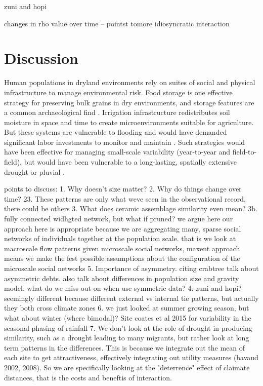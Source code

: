 \documentclass[fleqn,10pt]{wlscirep}
\begin{document}
zuni and hopi

changes in rho value over time -- pointst tomore idiosyncratic interaction


\section*{Discussion}
Human populations in dryland environments rely on suites of social and physical infrastructure to manage environmental risk. Food storage is one effective strategy for preserving bulk grains in dry environments, and storage features are a common archaeological find \cite{Spielmann2011SustainableEnvironments}. Irrigation infrastructure redistributes soil moisture in space and time to create microenvironments suitable for agriculture. But these systems are vulnerable to flooding and would have demanded significant labor investments to monitor and maintain \cite{Dominguez2005}. Such strategies would have been effective for managing small-scale variability (year-to-year and field-to-field), but would have been vulnerable to a long-lasting, spatially extensive drought or pluvial \cite{Halstead1989}.

points to discuss:
1. Why doesn't size matter?
2. Why do things change over time?
23. These patterns are only what weve seen in the observational record, there could be others
3. What does ceramic assemblage similarity even mean?
3b. fully connected widhgted network, but what if pruned?
  we argue here our approach here is appropriate because we are aggregating many, sparse social networks of individuals together at the population scale. that is we look at macroscale flow patterns given microscale social networks, maxent approach means we make the fest possible assumptions about the configuration of the microscale social networks
5. Importance of asymmetry. citing crabtree talk about asymmetric debts. also talk about differences in population size and gravity model. what do we miss out on when use symmetric data?
4. zuni and hopi? seemingly different because different external vs internal tie patterns, but actually they both cross climate zones
6. we just looked at summer growing season, but what about winter (where bimodal)? Site coates et al 2015 for variability in the seasonal phasing of rainfall
7. We don't look at the role of drought in producing similarity, such as a drought leading to many migrants, but rather look at long term patterns in the differences. This is because we integrate out the mean of each site to get attractiveness, effectively integrating out utility measures (bavaud 2002, 2008). So we are specifically looking at the "deterrence" effect of claimate distances, that is the costs and beneftis of interaction.
\end{document}
